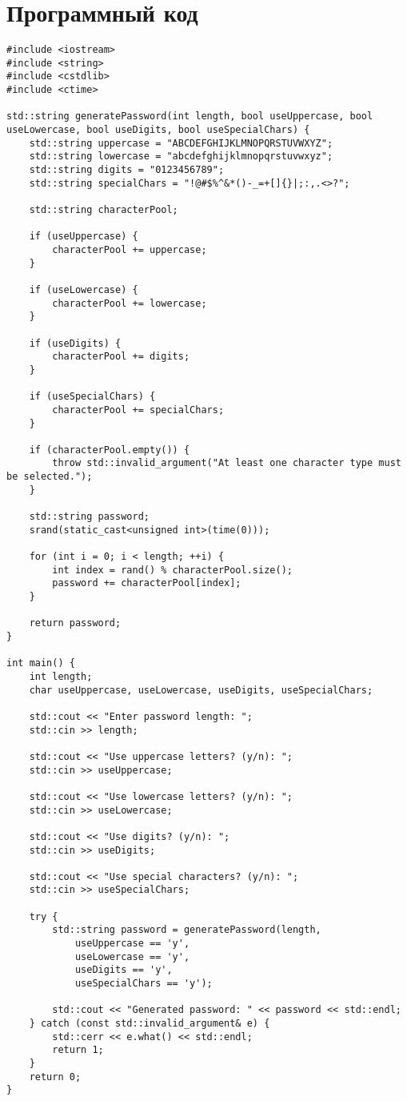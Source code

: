 \documentclass[14pt,a4paper]{scrartcl}
\begin{document}
\section{Программный код}
\begin{lstlisting}
#include <iostream>
#include <string>
#include <cstdlib>
#include <ctime>

std::string generatePassword(int length, bool useUppercase, bool useLowercase, bool useDigits, bool useSpecialChars) {
    std::string uppercase = "ABCDEFGHIJKLMNOPQRSTUVWXYZ";
    std::string lowercase = "abcdefghijklmnopqrstuvwxyz";
    std::string digits = "0123456789";
    std::string specialChars = "!@#$%^&*()-_=+[]{}|;:,.<>?";
    
    std::string characterPool;

    if (useUppercase) {
        characterPool += uppercase;
    }

    if (useLowercase) {
        characterPool += lowercase;
    }

    if (useDigits) {
        characterPool += digits;
    }

    if (useSpecialChars) {
        characterPool += specialChars;
    }

    if (characterPool.empty()) {
        throw std::invalid_argument("At least one character type must be selected.");
    }

    std::string password;
    srand(static_cast<unsigned int>(time(0)));

    for (int i = 0; i < length; ++i) {
        int index = rand() % characterPool.size();
        password += characterPool[index];
    }

    return password;
}

int main() {
    int length;
    char useUppercase, useLowercase, useDigits, useSpecialChars;

    std::cout << "Enter password length: ";
    std::cin >> length;

    std::cout << "Use uppercase letters? (y/n): ";
    std::cin >> useUppercase;

    std::cout << "Use lowercase letters? (y/n): ";
    std::cin >> useLowercase;

    std::cout << "Use digits? (y/n): ";
    std::cin >> useDigits;

    std::cout << "Use special characters? (y/n): ";
    std::cin >> useSpecialChars;

    try {
        std::string password = generatePassword(length,
            useUppercase == 'y',
            useLowercase == 'y',
            useDigits == 'y',
            useSpecialChars == 'y');

        std::cout << "Generated password: " << password << std::endl;
    } catch (const std::invalid_argument& e) {
        std::cerr << e.what() << std::endl;
        return 1;
    }
    return 0;
}
\end{lstlisting}
\newpage
\end{document}
